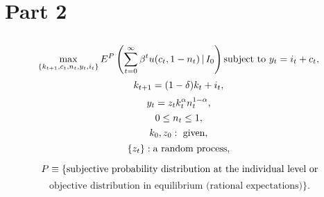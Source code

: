\documentclass{article}
\begin{document}
\section{Part 2}

\subsection{}

\[
\max_{\{k_{t+1}, c_t, n_t, y_t, i_t\}} E^P \left( \sum_{t=0}^{\infty} \beta^{t} u(c_t, 1 - n_t) \,|\, I_0 \right) \text{subject to } y_t = i_t + c_t,\\
\]
\[
k_{t+1} = (1 - \delta) k_t + i_t,\\
\]
\[
y_t = z_t k_t^\alpha n_t^{1 - \alpha},\\
\]
\[
0 \leq n_t \leq 1,\\
\]
\[
k_0, z_0: \text{ given},\\
\]
\[
\{ z_t \}: \text{a random process},\\
\]

\[
P \equiv \text{\{subjective probability distribution at the individual level or} \\
\]
\[
\text{objective distribution in equilibrium (rational expectations)\}}.
\]

\end{document}
